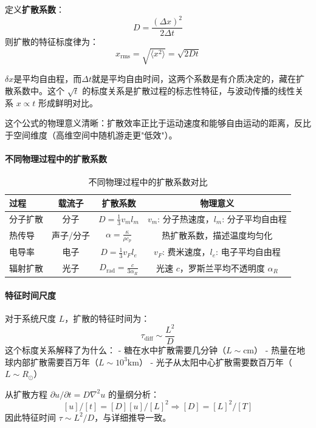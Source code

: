 定义\textbf{扩散系数}：
\[
D = \frac{(\Delta x)^2}{2\Delta t}
\]
则扩散的特征标度律为：
\[
\boxed{x_{\text{rms}} = \sqrt{\langle x^2 \rangle} = \sqrt{2Dt}}
\]

$\delta x$是平均自由程，而$\Delta t$就是平均自由时间，这两个系数是有介质决定的，藏在扩散系数中。这个 $\sqrt{t}$ 的标度关系是扩散过程的标志性特征，与波动传播的线性关系 $x \propto t$ 形成鲜明对比。



这个公式的物理意义清晰：扩散效率正比于运动速度和能够自由运动的距离，反比于空间维度（高维空间中随机游走更"低效"）。

\paragraph{不同物理过程中的扩散系数}

\begin{table}[h]
\centering
\caption{不同物理过程中的扩散系数对比}
\begin{tabular}{|l|c|c|c|}
\hline
\textbf{过程} & \textbf{载流子} & \textbf{扩散系数} & \textbf{物理意义} \\
\hline
分子扩散 & 分子 & $D = \frac{1}{3} v_m l_m$ & $v_m$: 分子热速度，$l_m$: 分子平均自由程 \\
热传导 & 声子/分子 & $\alpha = \frac{\kappa}{\rho c_p}$ & 热扩散系数，描述温度均匀化 \\
电导率 & 电子 & $D = \frac{1}{3} v_F l_e$ & $v_F$: 费米速度，$l_e$: 电子平均自由程 \\
辐射扩散 & 光子 & $D_{\text{rad}} = \frac{c}{3\alpha_R}$ & 光速 $c$，罗斯兰平均不透明度 $\alpha_R$ \\
\hline
\end{tabular}
\end{table}


\paragraph{特征时间尺度}
对于系统尺度 $L$，扩散的特征时间为：
\[
\tau_{\text{diff}} \sim \frac{L^2}{D}
\]
这个标度关系解释了为什么：
- 糖在水中扩散需要几分钟（$L \sim \text{cm}$）
- 热量在地球内部扩散需要百万年（$L \sim 10^3 \text{km}$）
- 光子从太阳中心扩散需要数百万年（$L \sim R_\odot$）

\begin{derivationnote}[量纲分析推导]
从扩散方程 $\partial u/\partial t = D\nabla^2 u$ 的量纲分析：
\[
[u]/[t] = [D][u]/[L]^2 \Rightarrow [D] = [L]^2/[T]
\]
因此特征时间 $\tau \sim L^2/D$，与详细推导一致。
\end{derivationnote}

